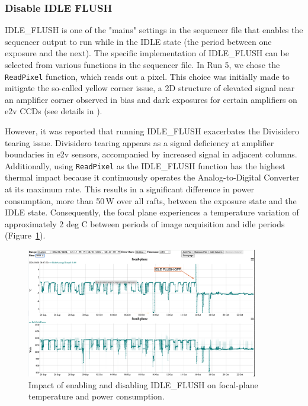 \subsubsection{Disable IDLE FLUSH}\label{section:disablingIDLEFLUSH}

IDLE\_FLUSH is one of the "mains" settings in the sequencer file that enables the sequencer output to run while in the IDLE state (the period between one exposure and the next). The specific implementation of IDLE\_FLUSH can be selected from various functions in the sequencer file. In Run 5, we chose the \texttt{ReadPixel} function, which reads out a pixel. This choice was initially made to mitigate the so-called yellow corner issue, a 2D structure of elevated signal near an amplifier corner observed in bias and dark exposures for certain amplifiers on e2v CCDs (see details in \citet{2024SPIE13103E..0WU}).

However, it was reported that running IDLE\_FLUSH exacerbates the Divisidero tearing issue. Divisidero tearing appears as a signal deficiency at amplifier boundaries in e2v sensors, accompanied by increased signal in adjacent columns. Additionally, using \texttt{ReadPixel} as the IDLE\_FLUSH function has the highest thermal impact because it continuously operates the Analog-to-Digital Converter at its maximum rate. This results in a significant difference in power consumption, more than 50\,W over all rafts, between the exposure state and the IDLE state. Consequently, the focal plane experiences a temperature variation of approximately 2 deg C between periods of image acquisition and idle periods (Figure~\ref{fig:IdleFlushEffect}).

\begin{figure}
\begin{centering}
\includegraphics[width=0.9\textwidth]{figures/REB_power_temp6_sept24_to_Oct23.png}
\end{centering}
\caption{Impact of enabling and disabling IDLE\_FLUSH on focal-plane temperature and power consumption.}\label{fig:IdleFlushEffect}
\end{figure}

